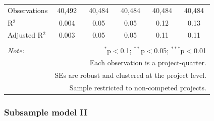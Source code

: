 \documentclass[
]{article}
\begin{document}
\begin{table}[H]
\begin{tabular}{@{\extracolsep{-2pt}}lccccc}
Observations & 40,492 & 40,484 & 40,484 & 40,484 & 40,484 \\ 
R$^{2}$ & 0.004 & 0.05 & 0.05 & 0.12 & 0.13 \\ 
Adjusted R$^{2}$ & 0.003 & 0.05 & 0.05 & 0.11 & 0.11 \\ 
\hline 
\hline \\[-1.8ex] 
\textit{Note:}  & \multicolumn{5}{r}{$^{*}$p$<$0.1; $^{**}$p$<$0.05; $^{***}$p$<$0.01} \\ 
 & \multicolumn{5}{r}{Each observation is a project-quarter.} \\ 
 & \multicolumn{5}{r}{SEs are robust and clustered at the project level.} \\ 
 & \multicolumn{5}{r}{Sample restricted to non-competed projects.} \\ 
\end{tabular} 
\end{table}

\hypertarget{subsample-model-ii}{%
\subsubsection{Subsample model II}\label{subsample-model-ii}}
\end{document}
